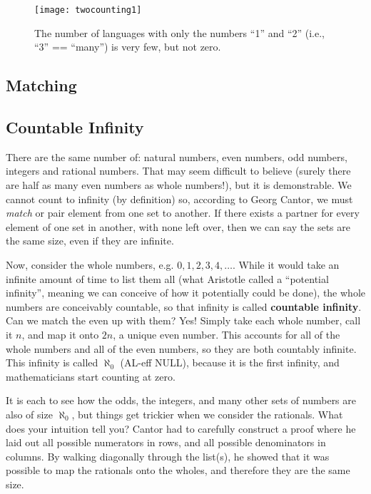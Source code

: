 
\begin{figure}
\begin{centering}
\texttt{[image: twocounting1]}
\caption[Languages with only two numbers]{The number of languages with only the numbers ``1'' and ``2'' (i.e., ``3'' == ``many'') is very few, but not zero.}
\end{centering}
\end{figure}

\subsection{Matching}


\subsection{Countable Infinity}
There are the same number of: natural numbers, even numbers, odd numbers, integers and
rational numbers.  That may seem difficult to believe (surely there are half as many even numbers
as whole numbers!), but it is demonstrable.  We cannot count to infinity (by definition) so,
according to Georg Cantor, we must \emph{match} or pair element from one set to another.
If there exists a partner for every element of one set in another, with none left over, then
we can say the sets are the same size, even if they are infinite.

Now, consider the whole numbers, e.g. $0, 1, 2, 3, 4, \dots$.  While it would take an infinite 
amount of time to list them all (what Aristotle called a ``potential infinity'', meaning we can
conceive of how it potentially could be done), the whole numbers are conceivably countable,
so that infinity is called \textbf{countable infinity}.  Can we match the even up with them?
Yes!  Simply take each whole number, call it $n$, and map it onto $2n$, a unique even 
number.  This accounts for all of the whole numbers and all of the even numbers, so 
they are both countably infinite.  This infinity is called $\aleph_0$ (AL-eff NULL), because
it is the first infinity, and mathematicians start counting at zero.

It is each to see how the odds, the integers, and many other sets of numbers are also
of size $\aleph_0$, but things get trickier when we consider the rationals.  What does
your intuition tell you?  Cantor had to carefully construct a proof where he laid out 
all possible numerators in rows, and all possible denominators in columns.  By walking
diagonally through the list(s), he showed that it was possible to map the rationals
onto the wholes, and therefore they are the same size.

